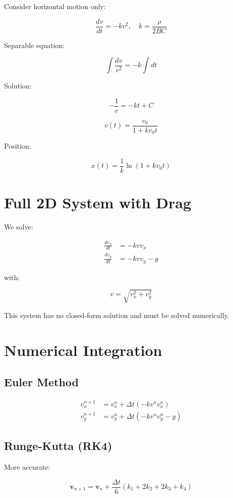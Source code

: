 \documentclass[11pt]{article}
\begin{document}
	Consider horizontal motion only:
	
	\[
	\frac{dv}{dt} = -k v^2, \quad k = \frac{\rho}{2 BC}
	\]
	
	Separable equation:
	
	\[
	\int \frac{dv}{v^2} = -k \int dt
	\]
	
	Solution:
	
	\[
	-\frac{1}{v} = -kt + C
	\]
	
	\[
	v(t) = \frac{v_0}{1 + k v_0 t}
	\]
	
	Position:
	
	\[
	x(t) = \frac{1}{k} \ln(1 + k v_0 t)
	\]
	
	\section{Full 2D System with Drag}
	
	We solve:
	
	\begin{align}
		\frac{dv_x}{dt} &= -k v v_x \\
		\frac{dv_y}{dt} &= -k v v_y - g
	\end{align}
	
	with:
	
	\[
	v = \sqrt{v_x^2 + v_y^2}
	\]
	
	This system has no closed-form solution and must be solved numerically.
	
	\section{Numerical Integration}
	
	\subsection{Euler Method}
	
	\begin{align}
		v_x^{n+1} &= v_x^n + \Delta t (-k v^n v_x^n) \\
		v_y^{n+1} &= v_y^n + \Delta t (-k v^n v_y^n - g)
	\end{align}
	
	\subsection{Runge-Kutta (RK4)}
	
	More accurate:
	
	\[
	\bm{v}_{n+1} = \bm{v}_n + \frac{\Delta t}{6}(k_1 + 2k_2 + 2k_3 + k_4)
	\]
	
\end{document}
